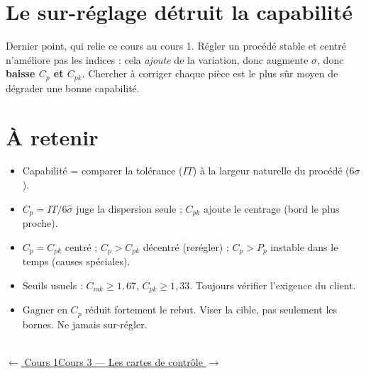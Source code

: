 \documentclass[11pt]{article}
\begin{document}
\section{Le sur-réglage détruit la capabilité}

Dernier point, qui relie ce cours au cours 1. Régler un procédé stable et centré n'améliore pas les indices : cela \emph{ajoute} de la variation, donc augmente $\sigma$, donc \textbf{baisse $C_p$ et $C_{pk}$}. Chercher à corriger chaque pièce est le plus sûr moyen de dégrader une bonne capabilité.


\section*{\color{uimmblue}À retenir}
\begin{itemize}
\item Capabilité = comparer la tolérance ($IT$) à la largeur naturelle du procédé ($6\sigma$).
\item $C_p = IT / 6\hat{\sigma}$ juge la dispersion seule ; $C_{pk}$ ajoute le centrage (bord le plus proche).
\item $C_p = C_{pk}$ centré ; $C_p > C_{pk}$ décentré (rerégler) ; $C_p > P_p$ instable dans le temps (causes spéciales).
\item Seuils usuels : $C_{mk} \ge 1{,}67$, $C_{pk} \ge 1{,}33$. Toujours vérifier l'exigence du client.
\item Gagner en $C_p$ réduit fortement le rebut. Viser la cible, pas seulement les bornes. Ne jamais sur-régler.
\end{itemize}

\vfill
\noindent\hrulefill\\[2pt]
{\footnotesize\color{uimmgrey}\href{1_Comprendre_la_Variabilite.pdf}{$\leftarrow$ Cours 1}\qquad\qquad\href{3_Les_Cartes_de_Controle.pdf}{Cours 3 — Les cartes de contrôle $\rightarrow$}}
\end{document}

